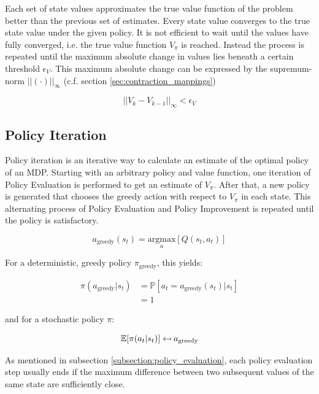 Each set of state values approximates the true value function of the problem better than the previous set of estimates. Every state value converges to the true state value under the given policy. It is not efficient to wait until the values have fully converged, i.e. the true value function $V_\pi$ is reached. Instead the process is repeated until the maximum absolute change in values lies beneath a certain threshold $\epsilon_V$. This maximum absolute change can be expressed by the supremum-norm $||(\cdot)||_\infty$ (c.f. section \ref{sec:contraction_mappings})

\begin{equation}
||V_{k}-V_{k-1}||_\infty<\epsilon_V
\label{eq:pe_stopping_criterion}
\end{equation}

\subsection{Policy Iteration}
\label{sec:PI}
Policy iteration is an iterative way to calculate an estimate of the optimal policy of an MDP. Starting with an arbitrary policy and value function, one iteration of Policy Evaluation is performed to get an estimate of $V_\pi$. After that, a new policy is generated that chooses the greedy action with respect to $V_\pi$ in each state. This alternating process of Policy Evaluation and Policy Improvement is repeated until the policy is satisfactory.

\begin{equation}
a_{\text{greedy}}(s_t) = \underset{a}{\text{argmax}}[Q(s_t,a_t)]
\end{equation}

For a deterministic, greedy policy $\pi_{\text{greedy}}$, this yields:

\begin{align}
\pi(a_{\text{greedy}}|s_t)&=\mathbb{P}[a_t=a_{\text{greedy}}(s_t)|s_t] \\ &=1
\end{align}

and for a stochastic policy $\pi$:

\begin{equation}
\mathbb{E}[\pi(a_t | s_t)] \mathrel{\reflectbox{\ensuremath{\mapsto}}} a_{\text{greedy}}
\end{equation}

As mentioned in subsection \ref{subsection:policy_evaluation}, each policy evaluation step usually ends if the maximum difference between two subsequent values of the same state are sufficiently close.

